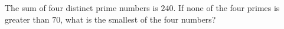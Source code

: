 The sum of four distinct prime numbers is $240$. If none of the four primes is greater than $70$, what is the smallest of the four numbers?
